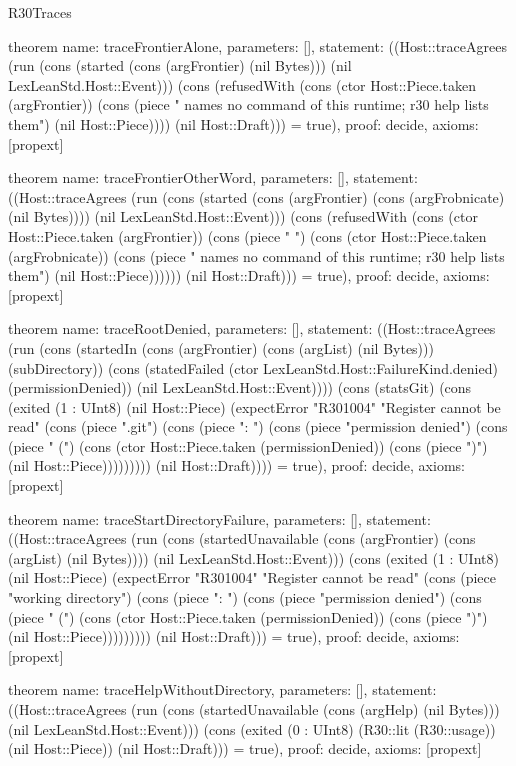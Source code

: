 \begin{lexlean}{R30Traces}
\begin{semanticmodule}
theorem{
  name: traceFrontierAlone,
  parameters: [],
  statement: ((Host::traceAgrees (run (cons (started (cons (argFrontier) (nil Bytes))) (nil LexLeanStd.Host::Event))) (cons (refusedWith (cons (ctor Host::Piece.taken (argFrontier)) (cons (piece " names no command of this runtime; r30 help lists them") (nil Host::Piece)))) (nil Host::Draft))) = true),
  proof: decide{},
  axioms: [propext]
}

theorem{
  name: traceFrontierOtherWord,
  parameters: [],
  statement: ((Host::traceAgrees (run (cons (started (cons (argFrontier) (cons (argFrobnicate) (nil Bytes)))) (nil LexLeanStd.Host::Event))) (cons (refusedWith (cons (ctor Host::Piece.taken (argFrontier)) (cons (piece " ") (cons (ctor Host::Piece.taken (argFrobnicate)) (cons (piece " names no command of this runtime; r30 help lists them") (nil Host::Piece)))))) (nil Host::Draft))) = true),
  proof: decide{},
  axioms: [propext]
}

theorem{
  name: traceRootDenied,
  parameters: [],
  statement: ((Host::traceAgrees (run (cons (startedIn (cons (argFrontier) (cons (argList) (nil Bytes))) (subDirectory)) (cons (statedFailed (ctor LexLeanStd.Host::FailureKind.denied) (permissionDenied)) (nil LexLeanStd.Host::Event)))) (cons (statsGit) (cons (exited (1 : UInt8) (nil Host::Piece) (expectError "R301004" "Register cannot be read" (cons (piece ".git") (cons (piece ": ") (cons (piece "permission denied") (cons (piece " (") (cons (ctor Host::Piece.taken (permissionDenied)) (cons (piece ")") (nil Host::Piece))))))))) (nil Host::Draft)))) = true),
  proof: decide{},
  axioms: [propext]
}

theorem{
  name: traceStartDirectoryFailure,
  parameters: [],
  statement: ((Host::traceAgrees (run (cons (startedUnavailable (cons (argFrontier) (cons (argList) (nil Bytes)))) (nil LexLeanStd.Host::Event))) (cons (exited (1 : UInt8) (nil Host::Piece) (expectError "R301004" "Register cannot be read" (cons (piece "working directory") (cons (piece ": ") (cons (piece "permission denied") (cons (piece " (") (cons (ctor Host::Piece.taken (permissionDenied)) (cons (piece ")") (nil Host::Piece))))))))) (nil Host::Draft))) = true),
  proof: decide{},
  axioms: [propext]
}

theorem{
  name: traceHelpWithoutDirectory,
  parameters: [],
  statement: ((Host::traceAgrees (run (cons (startedUnavailable (cons (argHelp) (nil Bytes))) (nil LexLeanStd.Host::Event))) (cons (exited (0 : UInt8) (R30::lit (R30::usage)) (nil Host::Piece)) (nil Host::Draft))) = true),
  proof: decide{},
  axioms: [propext]
}


\end{semanticmodule}
\end{lexlean}
